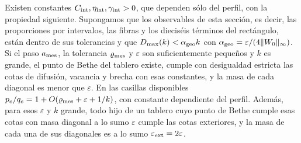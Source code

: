 \begin{proposicion}\label{meso:reconstruccion}
Existen constantes $C_{\rm int},\eta_{\rm int},\gamma_{\rm int}>0$, que dependen sólo del perfil, con
la propiedad siguiente.
Supongamos que los observables de esta sección, es decir, las proporciones por intervalos, las fibras
y los dieciséis términos del rectángulo, están dentro de sus tolerancias y que
$D_{\max}(k)<\alpha_{\rm geo} k$ con $\alpha_{\rm geo}=\varepsilon/(4\|W_0\|_\infty)$. Si el paso
$a_{\rm mes}$, la tolerancia
$\varrho_{\rm mes}$ y $\varepsilon$ son suficientemente pequeños y $k$ es grande, el punto de
Bethe del tablero existe, cumple con desigualdad estricta las cotas de difusión, vacancia y brecha
con esas constantes, y la masa de cada diagonal es menor que $\varepsilon$. En las casillas
disponibles $p_e/q_e=1+O(\varrho_{\rm mes}+\varepsilon+1/k)$, con constante dependiente del perfil. Además,
para esos $\varepsilon$ y $k$ grande, todo hijo de un tablero cuyo punto de Bethe cumple esas cotas con
masa diagonal a lo
sumo $\varepsilon$ cumple las cotas exteriores, y la masa de cada una de sus diagonales es a lo sumo
$\varepsilon_{\rm ext}=2\varepsilon$.
\end{proposicion}
